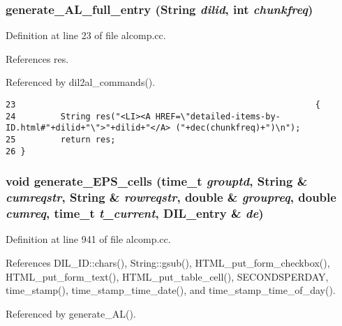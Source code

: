 \subsubsection{ generate\_\-AL\_\-full\_\-entry ({\bf String} {\em dilid}, int {\em chunkfreq})}\label{alcomp_8cc_a4}




Definition at line 23 of file alcomp.cc.

References res.

Referenced by dil2al\_\-commands().



\footnotesize\begin{verbatim}23                                                            {
24         String res("<LI><A HREF=\"detailed-items-by-ID.html#"+dilid+"\">"+dilid+"</A> ("+dec(chunkfreq)+")\n");
25         return res;
26 }
\end{verbatim}\normalsize 
{}
\subsubsection{\setlength{\rightskip}{0pt plus 5cm}void generate\_\-EPS\_\-cells (time\_\-t {\em grouptd}, {\bf String} \& {\em cumreqstr}, {\bf String} \& {\em rowreqstr}, double \& {\em groupreq}, double {\em cumreq}, time\_\-t {\em t\_\-current}, {\bf DIL\_\-entry} \& {\em de})}\label{alcomp_8cc_a12}




Definition at line 941 of file alcomp.cc.

References DIL\_\-ID::chars(), String::gsub(), HTML\_\-put\_\-form\_\-checkbox(), HTML\_\-put\_\-form\_\-text(), HTML\_\-put\_\-table\_\-cell(), SECONDSPERDAY, time\_\-stamp(), time\_\-stamp\_\-time\_\-date(), and time\_\-stamp\_\-time\_\-of\_\-day().

Referenced by generate\_\-AL().



